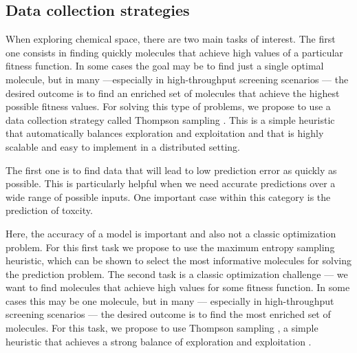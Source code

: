 \subsection{Data collection strategies}

When exploring chemical space, there are two main tasks of interest. The first one consists in finding quickly molecules that achieve high values of a particular fitness function. In some cases the goal may be to find just a single optimal molecule, but in many ---especially in high-throughput screening scenarios \cite{Pyzer_Knapp_2015a}--- the desired outcome is to find 
an enriched set of molecules that achieve the highest possible fitness values. For solving this type of problems, we propose to use a data collection strategy called Thompson sampling \cite{thompson_likelihood_1933}. This is a simple heuristic that automatically balances exploration and exploitation \cite{Chapelle2011} and that is highly scalable and easy to implement in a distributed setting.

The first one is to find data that will lead to low prediction error as quickly as possible. This is particularly helpful when we need accurate predictions over a wide range of possible inputs. One important case within this category is the prediction of toxcity. 

Here, the accuracy of a model is important and  also not a classic optimization problem. For this first task we propose to use the maximum entropy sampling heuristic, which can be shown to select the most informative molecules for solving
the prediction problem.  The second task is a classic optimization challenge --- we want to find molecules that achieve high values for some fitness
function.  In some cases this may be one molecule, but in many --- especially in high-throughput screening scenarios \cite{pyzer-knapp_what_2015} --- the
desired outcome is to find the most enriched set of molecules. For this task, we propose to use Thompson sampling \cite{thompson_likelihood_1933}, a simple
heuristic that achieves a strong balance of exploration and exploitation \cite{Chapelle2011}.